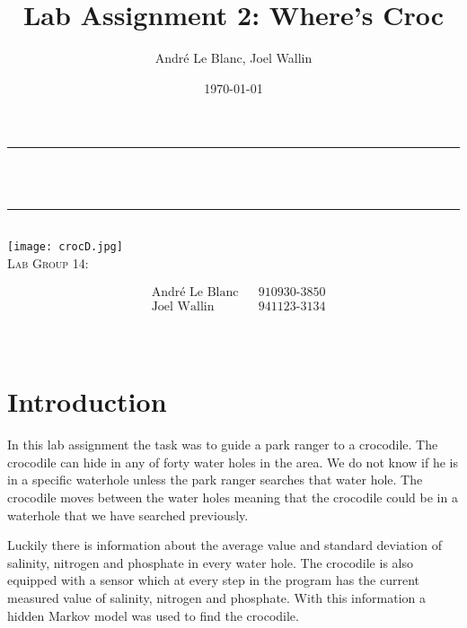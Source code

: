 \documentclass[12pt, a4paper]{article}
\title{Lab Assignment 2: Where’s Croc}	%
\author{André Le Blanc, Joel Wallin}
\date{\today}
\makeatletter
\let\thetitle\@title
\makeatother
\begin{document}
\begin{titlepage}
	\centering
    \vspace*{0.5 cm}
	\rule{\linewidth}{0.2 mm} \\[0.4 cm]
	{ \huge \bfseries \thetitle}\\  
	\rule{\linewidth}{0.2 mm} \\[1.5 cm]
    \texttt{[image: crocD.jpg]}\\[0.5 cm]
    
    \textsc{\Large Lab Group 14:}\\[0.5 cm]
	\begin{minipage}{0.4\textwidth}  
    \begin{align*}
	&\text{André Le Blanc}    &&\text{910930-3850}\\
	&\text{Joel Wallin}  &&\text{941123-3134}\\
	\end{align*}
	\end{minipage}\\[2 cm]
\end{titlepage}


\newpage
\tableofcontents
\newpage

\section{Introduction}

In this lab assignment the task was to guide a park ranger to a crocodile. The crocodile can hide in any of forty water holes in the area. We do not know if he is in a specific waterhole unless the park ranger searches that water hole. The crocodile moves between the water holes meaning that the crocodile could be in a waterhole that we have searched previously. 

Luckily there is information about the average value and standard deviation of salinity, nitrogen and phosphate in every water hole. The crocodile is also equipped with a sensor which at every step in the program has the current measured value of salinity, nitrogen and phosphate. With this information a hidden Markov model was used to find the crocodile.
\end{document}

